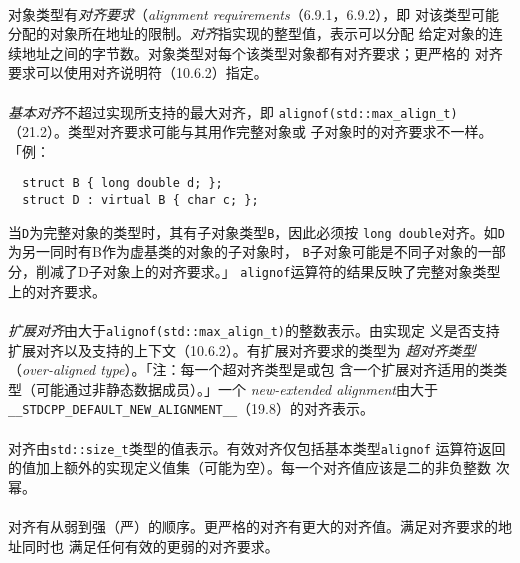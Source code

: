 \paragraph{}
对象类型有\textit{对齐要求}（\textit{alignment requirements}（6.9.1，6.9.2），即
对该类型可能分配的对象所在地址的限制。\textit{对齐}指实现的整型值，表示可以分配
给定对象的连续地址之间的字节数。对象类型对每个该类型对象都有对齐要求；更严格的
对齐要求可以使用对齐说明符（10.6.2）指定。

\paragraph{}
\textit{基本对齐}不超过实现所支持的最大对齐，即
\texttt{alignof(std::max\_align\_t)}（21.2）。类型对齐要求可能与其用作完整对象或
子对象时的对齐要求不一样。「例：
\begin{lstlisting}
  struct B { long double d; };
  struct D : virtual B { char c; };
\end{lstlisting}
当\texttt{D}为完整对象的类型时，其有子对象类型\texttt{B}，因此必须按
\texttt{long double}对齐。如\texttt{D}为另一同时有B作为虚基类的对象的子对象时，
\texttt{B}子对象可能是不同子对象的一部分，削减了D子对象上的对齐要求。」
\texttt{alignof}运算符的结果反映了完整对象类型上的对齐要求。

\paragraph{}
\textit{扩展对齐}由大于\texttt{alignof(std::max\_align\_t)}的整数表示。由实现定
义是否支持扩展对齐以及支持的上下文（10.6.2）。有扩展对齐要求的类型为
\textit{超对齐类型}（\textit{over-aligned type}）。「注：每一个超对齐类型是或包
含一个扩展对齐适用的类类型（可能通过非静态数据成员）。」一个
\textit{new-extended alignment}由大于
\texttt{\_\_STDCPP\_DEFAULT\_NEW\_ALIGNMENT\_\_}（19.8）的对齐表示。

\paragraph{}
对齐由\texttt{std::size\_t}类型的值表示。有效对齐仅包括基本类型\texttt{alignof}
运算符返回的值加上额外的实现定义值集（可能为空）。每一个对齐值应该是二的非负整数
次幂。

\paragraph{}
对齐有从弱到强（严）的顺序。更严格的对齐有更大的对齐值。满足对齐要求的地址同时也
满足任何有效的更弱的对齐要求。

